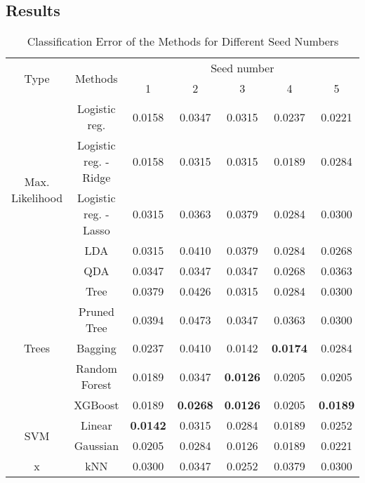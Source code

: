 \subsection{Results}
\begin{table}[htb]
	\caption{Classification Error of the Methods for Different Seed Numbers}
	\begin{center}
		\begin{tabular}{@{} c c c  c c c c @{}}\toprule
			\multirow{2}{*}{Type} & \multirow{2}{*}{Methods} &  \multicolumn{5}{c}{Seed number}\\
			& & 1 & 2 & 3 & 4 & 5 \\
			\midrule
			\multirow{5}{*}{Max. Likelihood} & Logistic reg. & \num{0.0158} & \num{0.0347} & \num{0.0315} & \num{0.0237} & \num{0.0221} \\
			& Logistic reg. - Ridge & \num{0.0158} & \num{0.0315} & \num{0.0315} & \num{0.0189} & \num{0.0284} \\
			& Logistic reg. - Lasso & \num{0.0315} & \num{0.0363} & \num{0.0379} & \num{0.0284} & \num{0.0300} \\
			& LDA & \num{0.0315} & \num{0.0410} & \num{0.0379} & \num{0.0284} & \num{0.0268} \\
			& QDA & \num{0.0347} & \num{0.0347} & \num{0.0347} & \num{0.0268} & \num{0.0363} \\
			\cmidrule{1-7}
			\multirow{5}{*}{Trees} & Tree & \num{0.0379} & \num{0.0426} & \num{0.0315} & \num{0.0284} & \num{0.0300}\\
			& Pruned Tree & \num{0.0394} & \num{0.0473} & \num{0.0347} & \num{0.0363} & \num{0.0300}\\  
			& Bagging & \num{0.0237} & \num{0.0410} & \num{0.0142} & \textbf{\num{0.0174}} & \num{0.0284}\\
			& Random Forest & \num{0.0189} & \num{0.0347} & \textbf{\num{0.0126}} & \num{0.0205} & \num{0.0205}\\
			& XGBoost & \num{0.0189} & \textbf{\num{0.0268}} & \textbf{\num{0.0126}} & \num{0.0205} & \textbf{\num{0.0189}}\\
			\cmidrule{1-7}
			\multirow{2}{*}{SVM} & Linear & \textbf{\num{0.0142}} & \num{0.0315} & \num{0.0284} & \num{0.0189} & \num{0.0252}\\
			& Gaussian & \num{0.0205} & \num{0.0284} & \num{0.0126} & \num{0.0189} & \num{0.0221}\\
			\cmidrule{1-7}
			x & kNN & \num{0.0300} & \num{0.0347} & \num{0.0252} & \num{0.0379} & \num{0.0300}\\
			\bottomrule
			\end{tabular}
			\end{center}
			\label{tab_res_naive}
\end{table}

